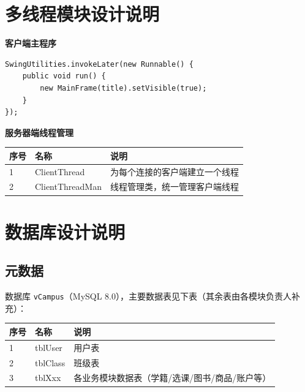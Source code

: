 \documentclass[12pt,a4paper]{ctexart}
\begin{document}
\section{多线程模块设计说明}

\textbf{客户端主程序}
\begin{verbatim}
SwingUtilities.invokeLater(new Runnable() {
    public void run() {
        new MainFrame(title).setVisible(true);
    }
});
\end{verbatim}

\textbf{服务器端线程管理}
\begin{center}
\begin{tabular}{l l l}
\toprule
序号 & 名称 & 说明 \\
\midrule
1 & ClientThread & 为每个连接的客户端建立一个线程 \\
2 & ClientThreadMan & 线程管理类，统一管理客户端线程 \\
\bottomrule
\end{tabular}
\end{center}

\section{数据库设计说明}

\subsection{元数据}
数据库 \texttt{vCampus}（MySQL 8.0），主要数据表见下表（其余表由各模块负责人补充）：
\begin{center}
\begin{tabular}{l l l}
\toprule
序号 & 名称 & 说明 \\
\midrule
1 & tblUser & 用户表 \\
2 & tblClass & 班级表 \\
3 & tblXxx & 各业务模块数据表（学籍/选课/图书/商品/账户等） \\
\bottomrule
\end{tabular}
\end{center}
\end{document}
